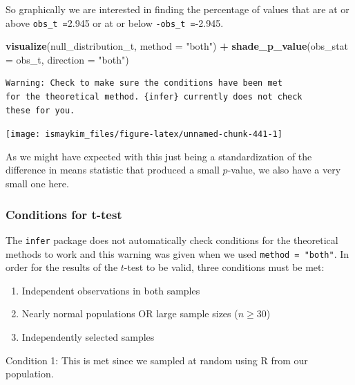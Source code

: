 \documentclass[12pt, krantz2,]{krantz}
\makeatletter
\newenvironment{Shaded}{\begin{snugshade}}{\end{snugshade}}
\newcommand{\DataTypeTok}[1]{\textcolor[rgb]{0.27,0.27,0.27}{#1}}
\newcommand{\KeywordTok}[1]{\textcolor[rgb]{0.27,0.27,0.27}{\textbf{#1}}}
\newcommand{\NormalTok}[1]{#1}
\newcommand{\OperatorTok}[1]{\textcolor[rgb]{0.43,0.43,0.43}{\textbf{#1}}}
\newcommand{\StringTok}[1]{\textcolor[rgb]{0.5,0.5,0.5}{#1}}
\providecommand{\tightlist}{%
  \setlength{\itemsep}{0pt}\setlength{\parskip}{0pt}}
\newenvironment{kframe}{%
\medskip{}
\setlength{\fboxsep}{.8em}
 \def\at@end@of@kframe{}%
 \ifinner\ifhmode%
  \def\at@end@of@kframe{\end{minipage}}%
  \begin{minipage}{\columnwidth}%
 \fi\fi%
 \def\FrameCommand##1{\hskip\@totalleftmargin \hskip-\fboxsep
 \colorbox{shadecolor}{##1}\hskip-\fboxsep
     \hskip-\linewidth \hskip-\@totalleftmargin \hskip\columnwidth}%
 \MakeFramed {\advance\hsize-\width
   \@totalleftmargin\z@ \linewidth\hsize
   \@setminipage}}%
 {\par\unskip\endMakeFramed%
 \at@end@of@kframe}
\renewenvironment{Shaded}{\begin{kframe}}{\end{kframe}}
\makeatother
\begin{document}
So graphically we are interested in finding the percentage of values that are at or above \texttt{obs\_t\ =}2.945 or at or below \texttt{-obs\_t\ =}-2.945.

\begin{Shaded}
\begin{Highlighting}[]
\KeywordTok{visualize}\NormalTok{(null_distribution_t, }\DataTypeTok{method =} \StringTok{"both"}\NormalTok{) }\OperatorTok{+}
\StringTok{  }\KeywordTok{shade_p_value}\NormalTok{(}\DataTypeTok{obs_stat =}\NormalTok{ obs_t, }\DataTypeTok{direction =} \StringTok{"both"}\NormalTok{)}
\end{Highlighting}
\end{Shaded}

\begin{verbatim}
Warning: Check to make sure the conditions have been met
for the theoretical method. {infer} currently does not check
these for you.
\end{verbatim}

\begin{center}\texttt{[image: ismaykim\_files/figure-latex/unnamed-chunk-441-1]} \end{center}

As we might have expected with this just being a standardization of the difference in means statistic that produced a small \(p\)-value, we also have a very small one here.

\hypertarget{conditions-for-t-test}{%
\subsubsection*{Conditions for t-test}\label{conditions-for-t-test}}


The \texttt{infer} package does not automatically check conditions for the theoretical methods to work and this warning was given when we used \texttt{method\ =\ "both"}. In order for the results of the \(t\)-test to be valid, three conditions must be met:

\begin{enumerate}
\def\labelenumi{\arabic{enumi}.}
\tightlist
\item
  Independent observations in both samples
\item
  Nearly normal populations OR large sample sizes (\(n \ge 30\))
\item
  Independently selected samples
\end{enumerate}

Condition 1: This is met since we sampled at random using R from our population.
\end{document}
